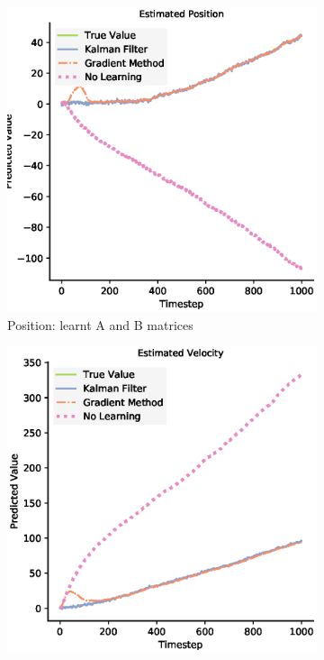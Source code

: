  
\begin{figure}
 \begin{subfigure}{0.49\textwidth}
 \centering
 \includegraphics[width=.95\linewidth]{chapter_3_figures/Estimated_Position_AB_matrix.eps}
 \caption{Position: learnt A and B matrices}
 \end{subfigure}
 \begin{subfigure}{0.49\textwidth}
 \centering
 \includegraphics[width=.95\linewidth]{chapter_3_figures/Estimated_Velocity_AB_matrix.eps}

\end{subfigure}
\end{figure}
